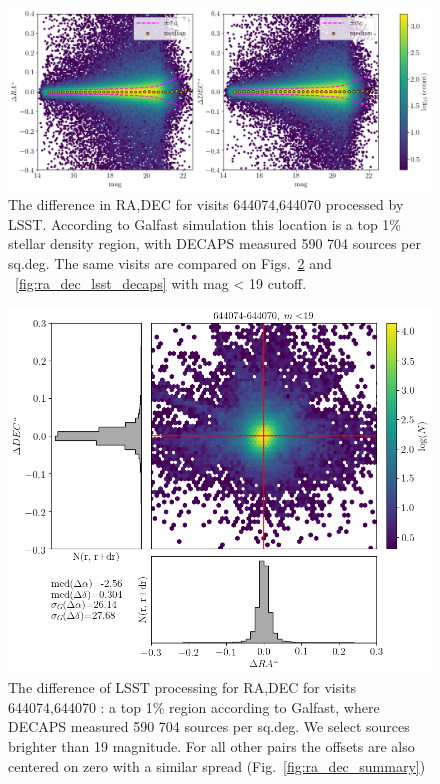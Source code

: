 \documentclass[DM,lsstdraft,toc,usenatbib]{lsstdoc}
\begin{document}
\begin{figure}
\begin{centering}
\includegraphics[width=1.0\columnwidth]{figs/644074-644070_dra_ddec_mag.png}
\caption{The difference in RA,DEC for visits 644074,644070 processed by LSST. According to Galfast simulation this location is a top 1\% stellar density region, with DECAPS measured 590 704 sources per sq.deg. The same visits are compared on Figs.~\ref{fig:ra_dec_lsst_lsst} and ~\ref{fig:ra_dec_lsst_decaps} with mag < 19 cutoff. }
\label{fig:ra_dec_mag}
\end{centering}
\end{figure} 



\begin{figure}
\begin{centering}
\includegraphics[width=0.8\columnwidth]{figs/lsst644074-644070_RA_DEC_offset_lims.png}
\caption{The difference of LSST processing for  RA,DEC for visits 644074,644070 : a top 1\% region according to Galfast, where DECAPS measured 590 704 sources per sq.deg. We select sources brighter than 19 magnitude.  For all other pairs the  offsets are also centered on zero with a similar spread (Fig.~\ref{fig:ra_dec_summary})}
\label{fig:ra_dec_lsst_lsst}
\end{centering}
\end{figure} 
\end{document}
